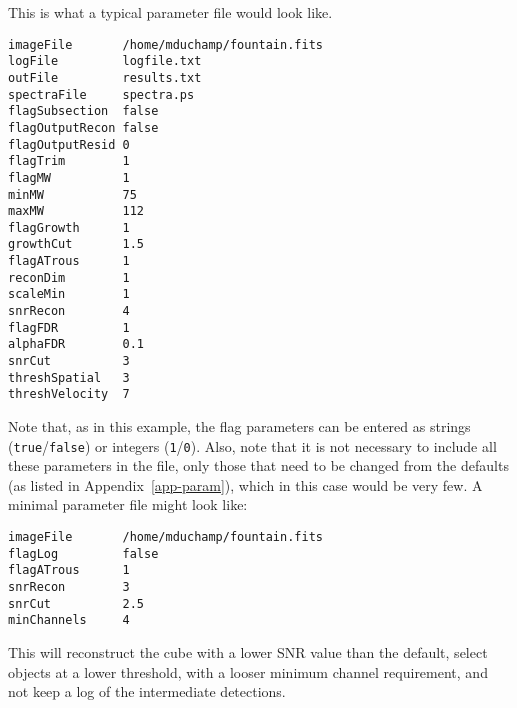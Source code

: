 %
%
%
%
\label{app-input}

This is what a typical parameter file would look like.

\begin{verbatim}
imageFile       /home/mduchamp/fountain.fits
logFile         logfile.txt
outFile         results.txt
spectraFile     spectra.ps
flagSubsection  false
flagOutputRecon false
flagOutputResid 0
flagTrim        1
flagMW          1
minMW           75
maxMW           112
flagGrowth      1
growthCut       1.5
flagATrous      1
reconDim        1          
scaleMin        1
snrRecon        4
flagFDR         1
alphaFDR        0.1
snrCut          3
threshSpatial   3
threshVelocity  7
\end{verbatim}

Note that, as in this example, the flag parameters can be entered as
strings (\texttt{true}/\texttt{false}) or integers
(\texttt{1}/\texttt{0}). Also, note that it is not necessary to
include all these parameters in the file, only those that need to be
changed from the defaults (as listed in Appendix~\ref{app-param}),
which in this case would be very few. A minimal parameter file might
look like:
\begin{verbatim}
imageFile       /home/mduchamp/fountain.fits
flagLog         false
flagATrous      1
snrRecon        3
snrCut          2.5
minChannels     4
\end{verbatim}
This will reconstruct the cube with a lower SNR value than the
default, select objects at a lower threshold,  with a looser minimum
channel requirement, and not keep a log of the intermediate
detections. 

